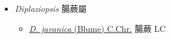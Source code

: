 
  \begin{itemize}
 \item[] \textit{Diplaziopsis} 腸蕨屬
                    
  \begin{itemize}
        \item[] \href{http://www.theplantlist.org/tpl1.1/search?q=Diplaziopsis+javanica}{\textit{D. javanica} (Blume) C.Chr.}   腸蕨 LC
  \end{itemize}
  \end{itemize}
